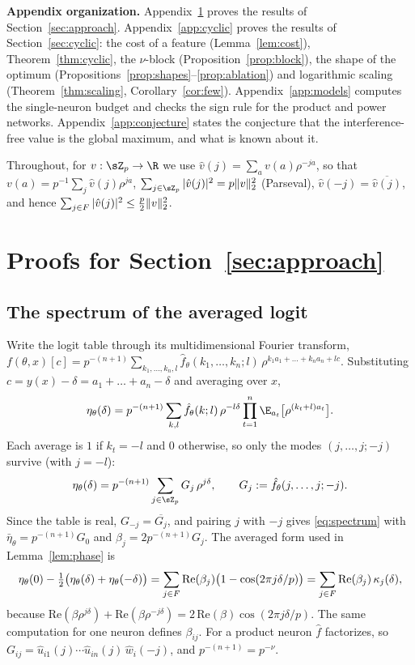 \textbf{Appendix organization.} Appendix~\ref{app:approach} proves the results of Section~\ref{sec:approach}. Appendix~\ref{app:cyclic} proves the results of Section~\ref{sec:cyclic}: the cost of a feature (Lemma~\ref{lem:cost}), Theorem~\ref{thm:cyclic}, the $\nu$-block (Proposition~\ref{prop:block}), the shape of the optimum (Propositions~\ref{prop:shapes}--\ref{prop:ablation}) and logarithmic scaling (Theorem~\ref{thm:scaling}, Corollary~\ref{cor:few}). Appendix~\ref{app:models} computes the single-neuron budget and checks the sign rule for the product and power networks. Appendix~\ref{app:conjecture} states the conjecture that the interference-free value is the global maximum, and what is known about it.

Throughout, for $v:\sZ_p\to\R$ we use $\hat v(j)=\sum_av(a)\rho^{-ja}$, so that $v(a)=p^{-1}\sum_j\hat v(j)\rho^{ja}$, $\sum_{j\in\sZ_p}|\hat v(j)|^2=p\|v\|_2^2$ (Parseval), $\hat v(-j)=\overline{\hat v(j)}$, and hence $\sum_{j\in F}|\hat v(j)|^2\le\frac p2\|v\|_2^2$.

\section{Proofs for Section~\ref{sec:approach}}\label{app:approach}

\subsection{The spectrum of the averaged logit}\label{app:spectrum}

Write the logit table through its multidimensional Fourier transform,
$f(\theta,x)[c]=p^{-(n+1)}\sum_{k_1,\dots,k_n,l}\hat f_\theta(k_1,\dots,k_n;l)\,\rho^{k_1a_1+\dots+k_na_n+lc}$. Substituting $c=y(x)-\delta=a_1+\dots+a_n-\delta$ and averaging over $x$,
\[
\eta_\theta(\delta)=p^{-(n+1)}\sum_{k,l}\hat f_\theta(k;l)\,\rho^{-l\delta}\prod_{t=1}^n\E_{a_t}\big[\rho^{(k_t+l)a_t}\big].
\]
Each average is $1$ if $k_t=-l$ and $0$ otherwise, so only the modes $(j,\dots,j;-j)$ survive (with $j=-l$):
\[
\eta_\theta(\delta)=p^{-(n+1)}\sum_{j\in\sZ_p}G_j\,\rho^{j\delta},\qquad G_j:=\hat f_\theta(j,\dots,j;-j).
\]
Since the table is real, $G_{-j}=\overline{G_j}$, and pairing $j$ with $-j$ gives \eqref{eq:spectrum} with $\bar\eta_\theta=p^{-(n+1)}G_0$ and $\beta_j=2p^{-(n+1)}G_j$. The averaged form used in Lemma~\ref{lem:phase} is
\[
\eta_\theta(0)-\tfrac12\big(\eta_\theta(\delta)+\eta_\theta(-\delta)\big)=\sum_{j\in F}\mathrm{Re}(\beta_j)\big(1-\cos(2\pi j\delta/p)\big)=\sum_{j\in F}\mathrm{Re}(\beta_j)\,\kappa_{j}(\delta),
\]
because $\mathrm{Re}(\beta\rho^{j\delta})+\mathrm{Re}(\beta\rho^{-j\delta})=2\,\mathrm{Re}(\beta)\cos(2\pi j\delta/p)$. The same computation for one neuron defines $\beta_{ij}$. For a product neuron $\hat f$ factorizes, so $G_{ij}=\hat u_{i1}(j)\cdots\hat u_{in}(j)\,\hat w_i(-j)$, and $p^{-(n+1)}=p^{-\nu}$.

